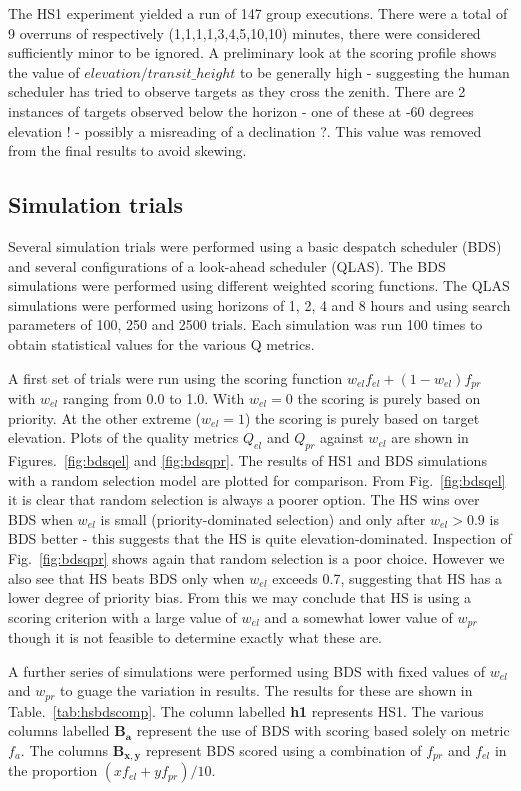 The HS1 experiment yielded a run of 147 group executions. There were a total of 9 overruns of respectively (1,1,1,1,3,4,5,10,10) minutes, there were considered sufficiently minor to be ignored. A preliminary look at the scoring profile shows the value of $elevation/transit\_height$ to be generally high - suggesting the human scheduler has tried to observe targets as they cross the zenith. There are 2 instances of targets observed below the horizon - one of these at -60 degrees elevation ! - possibly a misreading of a declination ?. This value was removed from the final results to avoid skewing.

\subsection{Simulation trials}
Several simulation trials were performed using a basic despatch scheduler (BDS) and several configurations of a look-ahead scheduler (QLAS). The BDS simulations were performed using different weighted scoring functions. The QLAS simulations were performed using horizons of 1, 2, 4 and 8 hours and using search parameters of 100, 250 and 2500 trials. Each simulation was run 100 times to obtain statistical values for the various Q metrics.

A first set of trials were run using the scoring function $w_{el}f_{el}+(1-w_{el})f_{pr}$ with $w_{el}$ ranging from 0.0 to 1.0. With $w_{el}=0$ the scoring is purely based on priority. At the other extreme ($w_{el}=1$) the scoring is purely based on target elevation. Plots of the quality metrics $Q_{el}$ and $Q_{pr}$ against $w_{el}$ are shown in Figures.~\ref{fig:bdsqel} and \ref{fig:bdsqpr}. The results of HS1 and BDS simulations with a random selection model are plotted for comparison. From Fig.~\ref{fig:bdsqel} it is clear that random selection is always a poorer option. The HS wins over BDS when $w_{el}$ is small (priority-dominated selection) and only after $w_{el}>0.9$ is BDS better - this suggests that the HS is quite elevation-dominated. Inspection of Fig.~\ref{fig:bdsqpr} shows again that random selection is a poor choice. However we also see that HS beats BDS only when $w_{el}$ exceeds 0.7, suggesting that HS has a lower degree of priority bias. From this we may conclude that HS is using a scoring criterion with a large value of $w_{el}$ and a somewhat lower value of $w_{pr}$ though it is not feasible to determine exactly what these are.

A further series of simulations were performed using BDS with fixed values of $w_{el}$ and $w_{pr}$ to guage the variation in results. The results for these are shown in Table.~\ref{tab:hsbdscomp}. The column labelled {\bf h1} represents HS1. The various columns labelled $\mathbf{B_a}$ represent the use of BDS with scoring based solely on metric $f_a$. The columns $\mathbf{B_{x,y}}$ represent BDS scored using a combination of $f_{pr}$ and $f_{el}$ in the proportion $(xf_{el}+yf_{pr})/10$. 

